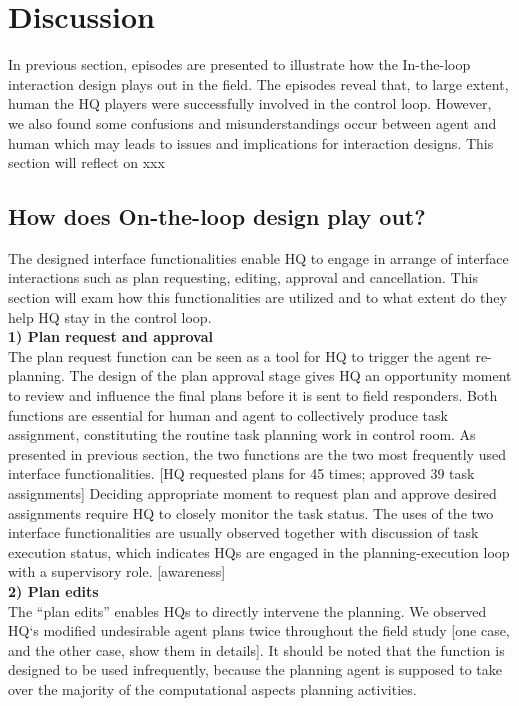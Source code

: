 \section{Discussion}

In previous section, episodes are presented to illustrate how the In-the-loop interaction design plays out in the field.  The episodes reveal that, to large extent, human the HQ players were successfully involved in the control loop. However, we also found some confusions and misunderstandings occur between agent and human which may leads to issues and implications for interaction designs. This section will reflect on xxx \\

\subsection{How does On-the-loop design play out?}
The designed interface functionalities enable HQ to engage in arrange of interface interactions such as plan requesting, editing, approval and cancellation. This section will exam how this functionalities are utilized and to what extent do they help HQ stay in the control loop. \\

\textbf{ 1) Plan request and approval }\\
The plan request function can be seen as a tool for HQ to trigger the agent re-planning. The design of the plan approval stage gives HQ an opportunity moment to review and influence the final plans before it is sent to field responders. Both functions are essential for human and agent to collectively produce task assignment, constituting the routine task planning work in control room. As presented in previous section, the two functions are the two most frequently used interface functionalities. [HQ requested plans for 45 times; approved 39 task assignments] Deciding appropriate moment to request plan and approve desired assignments require HQ to closely monitor the task status. The uses of the two interface functionalities are usually observed together with discussion of task execution status, which indicates HQs are engaged in the planning-execution loop with a supervisory role. [awareness]\\

\textbf{ 2) Plan edits }\\
The ``plan edits'' enables HQs to directly intervene the planning. We observed HQ`s modified undesirable agent plans twice throughout the field study [one case, and the other case, show them in details]. It should be noted that the function is designed to be used infrequently, because the planning agent is supposed to take over the majority of the computational aspects 
planning activities. \\

